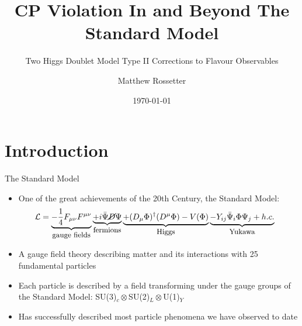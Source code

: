 \documentclass[10pt,xcolor={table,dvipsnames},t]{beamer}
\title{CP Violation In and Beyond The Standard Model}
\subtitle{Two Higgs Doublet Model Type II Corrections to Flavour Observables}
\author{Matthew Rossetter}
\institute{}
\date{\today}
\begin{document}
\section{Introduction}
\begin{frame}
  \titlepage
\end{frame}

\begin{frame}{The Standard Model}
    \begin{itemize}
        \item One of the great achievements of the 20th Century, the Standard Model:
            \begin{align}
                \mathcal{L} &= \underbrace{-\frac14 F_{\mu\nu}F^{\mu\nu}}_{\text{\small gauge fields}} \underbrace{+ i\bar{\Psi}\cancel{D}\Psi}_{\text{\small fermions}} \underbrace{+ (D_\mu\Phi)^\dagger(D^\mu\Phi) - V(\Phi)}_{\text{\small Higgs}} \underbrace{- Y_{ij}\bar{\Psi}_i\Phi\Psi_j + h.c.}_{\text{\small Yukawa}}
            \end{align}
        \item A gauge field theory describing matter and its interactions with 25 fundamental particles
        \item Each particle is described by a field transforming under the gauge groups of the Standard Model: SU(3)$_c\otimes$SU(2)$_L\otimes$U(1)$_Y$
        \item Has successfully described most particle phenomena we have observed to date
    \end{itemize}
\end{frame}
\end{document}
